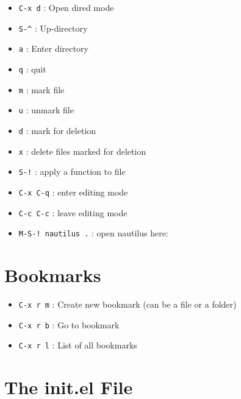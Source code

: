 \documentclass[11pt]{article}
\begin{document}
\begin{itemize}
\item \texttt{C-x d}            : Open dired mode

\item \texttt{S-\textasciicircum{}}              : Up-directory

\item \texttt{a}                : Enter directory

\item \texttt{q}                : quit

\item \texttt{m}                : mark file

\item \texttt{u}                : unmark file

\item \texttt{d}                : mark for deletion

\item \texttt{x}                : delete files marked for deletion

\item \texttt{S-!}              : apply a function to file

\item \texttt{C-x C-q}          : enter editing mode

\item \texttt{C-c C-c}          : leave editing mode

\item \texttt{M-S-! nautilus .} : open nautilus here:
\end{itemize}

\section{Bookmarks}
\label{sec:org8f87111}

\begin{itemize}
\item \texttt{C-x r m} : Create new bookmark (can be a file or a folder)

\item \texttt{C-x r b} : Go to bookmark

\item \texttt{C-x r l} : List of all bookmarks
\end{itemize}

\section{The init.el File}
\label{sec:orgde01e1c}
\end{document}
